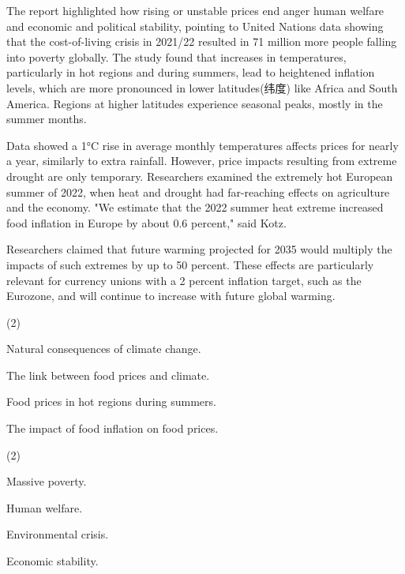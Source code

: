 \documentclass{英语试卷}
\begin{document}
\par The report highlighted how rising or unstable prices end anger human welfare and economic and political stability, pointing to United Nations data showing that the cost-of-living crisis in 2021/22 resulted in 71 million more people falling into poverty globally. The study found that increases in temperatures, particularly in hot regions and during summers, lead to heightened inflation levels, which are more pronounced in lower latitudes(纬度) like Africa and South America. Regions at higher latitudes experience seasonal peaks, mostly in the summer months.\par
\par Data showed a 1°C rise in average monthly temperatures affects prices for nearly a year, similarly to extra rainfall. However, price impacts resulting from extreme drought are only temporary. Researchers examined the extremely hot European summer of 2022, when heat and drought had far-reaching effects on agriculture and the economy. "We estimate that the 2022 summer heat extreme increased food inflation in Europe by about 0.6 percent," said Kotz.\par
\par Researchers claimed that future warming projected for 2035 would multiply the impacts of such extremes by up to 50 percent. These effects are particularly relevant for currency unions with a 2 percent inflation target, such as the Eurozone, and will continue to increase with future global warming.\par
{}
\begin{choices}(2)
  \item Natural consequences of climate change.
  \item The link between food prices and climate.
  \item Food prices in hot regions during summers.
  \item The impact of food inflation on food prices.
\end{choices}
\begin{choices}(2)
  \item Massive poverty.
  \item Human welfare.
  \item Environmental crisis.
  \item Economic stability.
\end{choices}
\end{document}
